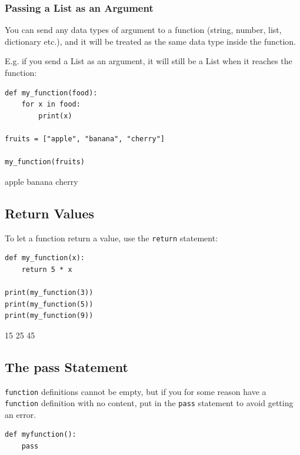 \documentclass[12pt,a4paper]{article}
\newcommand{\code}[1]{%
	\colorbox{backcolour}{\lstinline{#1}}%
}
\begin{document}
\subsubsection{Passing a List as an Argument}

You can send any data types of argument to a function (string, number, list,
dictionary etc.), and it will be treated as the same data type inside the
function.

E.g. if you send a List as an argument, it will still be a List when it reaches the function:

\begin{ebox}
	\begin{lstlisting}
def my_function(food):
    for x in food:
        print(x)

fruits = ["apple", "banana", "cherry"]

my_function(fruits)
	\end{lstlisting}
\tcblower
	\begin{vercode}
apple
banana
cherry
	\end{vercode}
\end{ebox}
\subsection{Return Values}

To let a function return a value, use the \code{return} statement:

\begin{ebox}
	\begin{lstlisting}
def my_function(x):
    return 5 * x

print(my_function(3))
print(my_function(5))
print(my_function(9))
	\end{lstlisting}
\tcblower
	\begin{vercode}
15
25
45
	\end{vercode}
\end{ebox}
\subsection{The pass Statement}

\code{function} definitions cannot be empty, but if you for some reason have a
\code{function} definition with no content, put in the \code{pass} statement to
avoid getting an error.

\begin{ebox}
	\begin{lstlisting}
def myfunction():
    pass
	\end{lstlisting}
\end{ebox}
\end{document}

